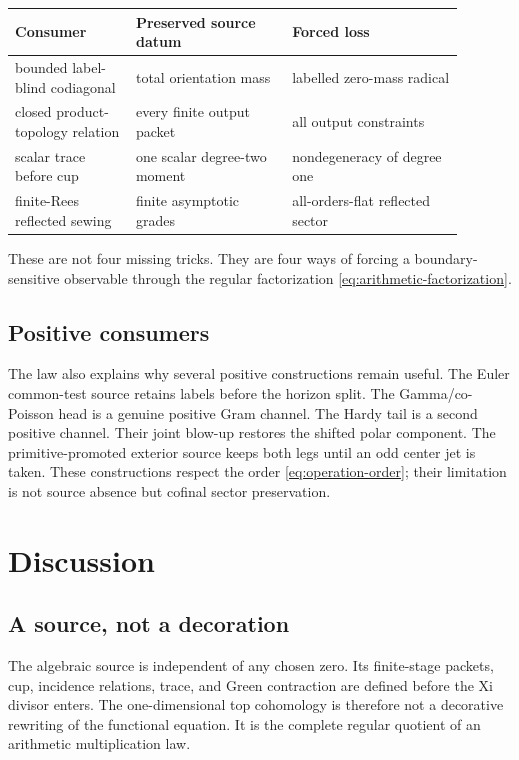 \documentclass[11pt]{article}
\theoremstyle{definition}
\theoremstyle{remark}
\begin{document}
\begin{center}
\begin{tabular}{>{\raggedright\arraybackslash}p{0.24\linewidth}
                >{\raggedright\arraybackslash}p{0.31\linewidth}
                >{\raggedright\arraybackslash}p{0.34\linewidth}}
\toprule
Consumer & Preserved source datum & Forced loss\\
\midrule
bounded label-blind codiagonal
  & total orientation mass
  & labelled zero-mass radical\\
closed product-topology relation
  & every finite output packet
  & all output constraints\\
scalar trace before cup
  & one scalar degree-two moment
  & nondegeneracy of degree one\\
finite-Rees reflected sewing
  & finite asymptotic grades
  & all-orders-flat reflected sector\\
\bottomrule
\end{tabular}
\end{center}

These are not four missing tricks.  They are four ways of forcing a
boundary-sensitive observable through the regular factorization
\eqref{eq:arithmetic-factorization}.

\subsection{Positive consumers}

The law also explains why several positive constructions remain useful.
The Euler common-test source retains labels before the horizon split.  The
Gamma/co-Poisson head is a genuine positive Gram channel.  The Hardy tail
is a second positive channel.  Their joint blow-up restores the shifted
polar component.  The primitive-promoted exterior source keeps both legs
until an odd center jet is taken.  These constructions respect the order
\eqref{eq:operation-order}; their limitation is not source absence but
cofinal sector preservation.

\section{Discussion}

\subsection{A source, not a decoration}

The algebraic source is independent of any chosen zero.  Its finite-stage
packets, cup, incidence relations, trace, and Green contraction are defined
before the Xi divisor enters.  The one-dimensional top cohomology is
therefore not a decorative rewriting of the functional equation.  It is
the complete regular quotient of an arithmetic multiplication law.
\end{document}
